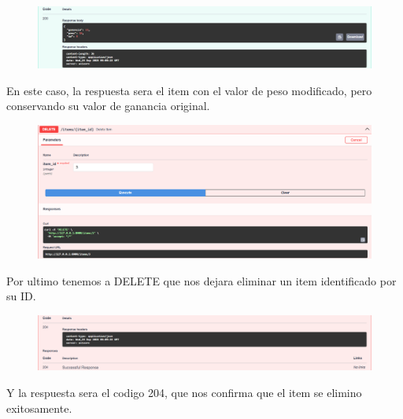 \documentclass[12pt]{article}
\begin{document}
\begin{figure}[H]
    \centering
    \includegraphics[width=1\textwidth]{Imagenes/PATCH2.png}
\end{figure}
En este caso, la respuesta sera el item con el valor de peso modificado, pero conservando su valor de ganancia original.

\begin{figure}[H]
    \centering
    \includegraphics[width=1\textwidth]{Imagenes/DELETE1.png}
\end{figure}
Por ultimo tenemos a DELETE que nos dejara eliminar un item identificado por su ID.

\begin{figure}[H]
    \centering
    \includegraphics[width=1\textwidth]{Imagenes/DELETE2.png}
\end{figure}
Y la respuesta sera el codigo 204, que nos confirma que el item se elimino exitosamente.
\end{document}
